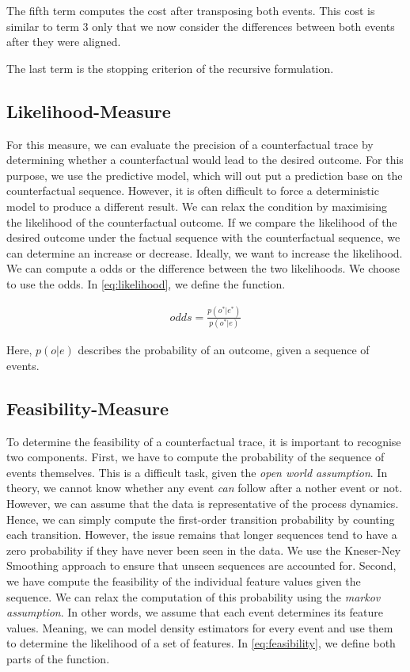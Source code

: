 \documentclass[./../../paper.tex]{subfiles}
\begin{document}
The fifth term computes the cost after transposing both events. This cost is similar to term 3 only that we now consider the differences between both events after they were aligned. 

The last term is the stopping criterion of the recursive formulation.  

\subsection{Likelihood-Measure}
For this measure, we can evaluate the precision of a counterfactual trace by determining whether a counterfactual would lead to the desired outcome. For this purpose, we use the predictive model, which will out put a prediction base on the counterfactual sequence. However, it is often difficult to force a deterministic model to produce a different result. We can relax the condition by maximising the likelihood of the counterfactual outcome. If we compare the likelihood of the desired outcome under the factual sequence with the counterfactual sequence, we can determine an increase or decrease. Ideally, we want to increase the likelihood. We can compute a odds or the difference between the two likelihoods. We choose to use the odds. In \autoref{eq:likelihood}, we define the function.

\begin{align}
    \label{eq:likelihood}
    odds = \frac{p(o^*|e^*)}{p(o^*|e)}
\end{align}

Here, $p(o|e)$ describes the probability of an outcome, given a sequence of events.

\subsection{Feasibility-Measure}
To determine the feasibility of a counterfactual trace, it is important to recognise two components. First, we have to compute the probability of the sequence of events themselves. This is a difficult task, given the \emph{open world assumption}. In theory, we cannot know whether any event \emph{can} follow after a nother event or not. However, we can assume that the data is representative of the process dynamics. Hence, we can simply compute the first-order transition probability by counting each transition. However, the issue remains that longer sequences tend to have a zero probability if they have never been seen in the data. We use the Kneser-Ney Smoothing\needscite{} approach to ensure that unseen sequences are accounted for. Second, we have compute the feasibility of the individual feature values given the sequence. We can relax the computation of this probability using the \emph{markov assumption}. In other words, we assume that each event determines its feature values. Meaning, we can model density estimators for every event and use them to determine the likelihood of a set of features. In \autoref{eq:feasibility}, we define both parts of the function.
\end{document}
